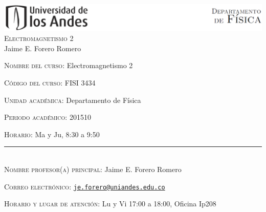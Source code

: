 \documentclass[letterpaper,10pt,onecolumn]{article}
\begin{document}
\begin{center}

\includegraphics[width=490pt]{header.png}\\[0.5cm]

\textsc{\LARGE Electromagnetismo 2}\\[0.1cm]

\large Jaime E. Forero Romero\\[0.5cm]

\end{center}

\large \noindent\textsc{Nombre del curso:}  Electromagnetismo 2%
  
\noindent\textsc{C\'odigo del curso:} FISI 3434 %

\noindent\textsc{Unidad acad\'emica:} Departamento de F\'isica

\noindent\textsc{Periodo acad\'emico:} 201510 %

\noindent\textsc{Horario:} Ma y Ju, 8:30 a 9:50%

\noindent\rule{\textwidth}{1pt}\\[-0.3cm]

\normalsize \noindent\textsc{Nombre profesor(a) principal:} Jaime
E. Forero Romero%

\noindent\textsc{Correo electr\'onico:}
\href{mailto:je.forero@uniandes.edu.co}{\nolinkurl{je.forero@uniandes.edu.co}}

\noindent\textsc{Horario y lugar de atenci\'on:} Lu y Vi 17:00 a
18:00, Oficina Ip208 %


\end{document}
